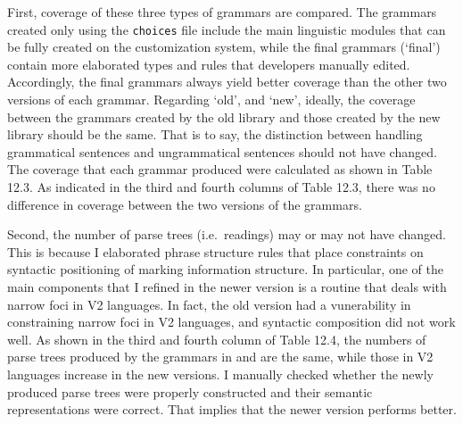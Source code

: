 First, coverage of these three types of grammars are compared.  The
grammars created only using the \texttt{choices} file include the main
linguistic modules that can be fully created on the \lingo
{} customization system, while the final grammars
(`final') contain more elaborated types and rules that developers
manually edited. Accordingly, the final grammars always yield better
coverage than the other two versions of each grammar. Regarding `old',
and `new', ideally, the coverage between the grammars created by the
old library and those created by the new library should be the same.
That is to say, the distinction between handling grammatical sentences
and ungrammatical sentences should not have changed.  The coverage
that each grammar produced were calculated as shown in Table 12.3.  As
indicated in the third and fourth columns of Table 12.3, there was no
difference in coverage between the two versions of the grammars.


Second, the number of parse trees (i.e.\ readings) may or may not have
changed. This is because I elaborated phrase structure rules that
place constraints on syntactic positioning of marking information
structure. In particular, one of the main
components that I refined in the newer version is a routine that deals
with narrow foci in V2 languages. In fact, the old version had a
vunerability in constraining narrow foci in V2 languages, and
syntactic composition did not work well.  As shown in the third and
fourth column of Table 12.4, the numbers of parse trees produced by
the grammars in  and  are the same, while
those in V2 languages increase in the new versions. I manually checked
whether the newly produced parse trees were properly constructed and
their semantic representations were correct.  That implies that the
newer version performs better.




